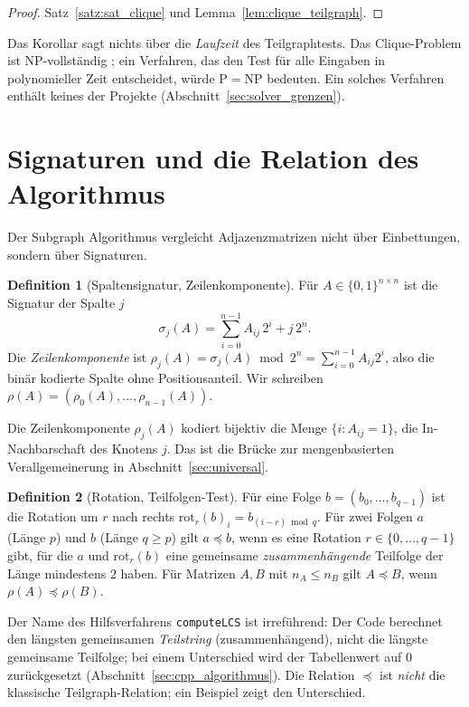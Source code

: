 \documentclass[a4paper,12pt,twoside]{report}
\DeclareRobustCommand{\_}{\textunderscore\allowbreak{}}
\theoremstyle{definition}
\newtheorem{definition}{Definition}[chapter]
\begin{document}
\begin{proof}
	Satz~\ref{satz:sat_clique} und Lemma~\ref{lem:clique_teilgraph}.
\end{proof}
 
Das Korollar sagt nichts über die \emph{Laufzeit} des Teilgraphtests. Das Clique-Problem ist NP-vollständig \cite{karp1972,garey1979}; ein Verfahren, das den Test für alle Eingaben in polynomieller Zeit entscheidet, würde $\mathrm{P}=\mathrm{NP}$ bedeuten. Ein solches Verfahren enthält keines der Projekte (Abschnitt~\ref{sec:solver_grenzen}).
 
\section{Signaturen und die Relation des Algorithmus}
\label{sec:signaturen}
 
Der Subgraph Algorithmus \cite{epp2026subgraph} vergleicht Adjazenzmatrizen nicht über Einbettungen, sondern über Signaturen.
 
\begin{definition}[Spaltensignatur, Zeilenkomponente]
	Für $A\in\{0,1\}^{n\times n}$ ist die Signatur der Spalte $j$
	\[
	\sigma_j(A)=\sum_{i=0}^{n-1}A_{ij}\,2^{i}+j\,2^{n}.
	\]
	Die \emph{Zeilenkomponente} ist $\rho_j(A)=\sigma_j(A)\bmod 2^{n}=\sum_{i=0}^{n-1}A_{ij}2^i$, also die binär kodierte Spalte ohne Positionsanteil. Wir schreiben $\rho(A)=(\rho_0(A),\ldots,\rho_{n-1}(A))$.
\end{definition}
 
Die Zeilenkomponente $\rho_j(A)$ kodiert bijektiv die Menge $\{i : A_{ij}=1\}$, die In-Nachbarschaft des Knotens $j$. Das ist die Brücke zur mengenbasierten Verallgemeinerung in Abschnitt~\ref{sec:universal}.
 
\begin{definition}[Rotation, Teilfolgen-Test]
	Für eine Folge $b=(b_0,\ldots,b_{q-1})$ ist die Rotation um $r$ nach rechts $\mathrm{rot}_r(b)_i=b_{(i-r)\bmod q}$. Für zwei Folgen $a$ (Länge $p$) und $b$ (Länge $q\ge p$) gilt $a\preceq b$, wenn es eine Rotation $r\in\{0,\ldots,q-1\}$ gibt, für die $a$ und $\mathrm{rot}_r(b)$ eine gemeinsame \emph{zusammenhängende} Teilfolge der Länge mindestens $2$ haben. Für Matrizen $A,B$ mit $n_A\le n_B$ gilt $A\preceq B$, wenn $\rho(A)\preceq\rho(B)$.
\end{definition}
 
Der Name des Hilfsverfahrens \texttt{computeLCS} ist irreführend: Der Code berechnet den längsten gemeinsamen \emph{Teilstring} (zusammenhängend), nicht die längste gemeinsame Teilfolge; bei einem Unterschied wird der Tabellenwert auf $0$ zurückgesetzt (Abschnitt~\ref{sec:cpp_algorithmus}). Die Relation $\preceq$ ist \emph{nicht} die klassische Teilgraph-Relation; ein Beispiel zeigt den Unterschied.
 
\end{document}
